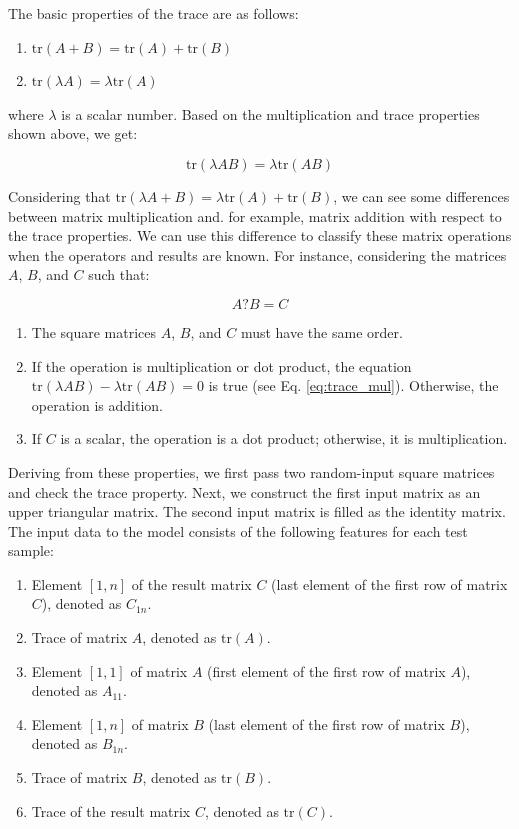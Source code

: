 \documentclass[manuscript,screen,review]{acmart}
\begin{document}
The basic properties of the trace are as follows:
\begin{enumerate}
	\item \(\text{tr}(A+B) = \text{tr}(A) + \text{tr}(B)\)
	\item \(\text{tr}(\lambda A) = \lambda \text{tr}(A)\)
\end{enumerate}

where \(\lambda\) is a scalar number. Based on the multiplication and trace properties shown above, we get:

\begin{equation}
	\text{tr}(\lambda AB) = \lambda \text{tr}(AB)
	\label{eq:trace_mul}
\end{equation}

Considering that \(\text{tr}(\lambda A + B) = \lambda \text{tr}(A) + \text{tr}(B)\), we can see some differences between matrix multiplication and. for example, matrix addition with respect to the trace properties. We can use this difference to classify these matrix operations when the operators and results are known. For instance, considering the matrices \(A\), \(B\), and \(C\) such that:

\begin{equation}
	A ? B = C
	\label{eq:operation}
\end{equation}

\begin{enumerate}
	\item The square matrices \(A\), \(B\), and \(C\) must have the same order.
	\item If the operation is multiplication or dot product, the equation \(\text{tr}(\lambda AB) - \lambda \text{tr}(AB) = 0\) is true (see Eq. \eqref{eq:trace_mul}). Otherwise, the operation is addition.
	\item If \(C\) is a scalar, the operation is a dot product; otherwise, it is multiplication.
\end{enumerate}

Deriving from these properties, we first pass two random-input square matrices and check the trace property. Next, we construct the first input matrix as an upper triangular matrix. The second input matrix is filled as the identity matrix. The input data to the model consists of the following features for each test sample:
\begin{enumerate}
	\item Element \([1,n]\) of the result matrix \(C\) (last element of the first row of matrix \(C\)), denoted as \(C_{1n}\).
	\item Trace of matrix \(A\), denoted as \(\text{tr}(A)\).
	\item Element \([1,1]\) of matrix \(A\) (first element of the first row of matrix \(A\)), denoted as \(A_{11}\).
	\item Element \([1,n]\) of matrix \(B\) (last element of the first row of matrix \(B\)), denoted as \(B_{1n}\).
	\item Trace of matrix \(B\), denoted as \(\text{tr}(B)\).
	\item Trace of the result matrix \(C\), denoted as \(\text{tr}(C)\).
\end{enumerate}
\end{document}
